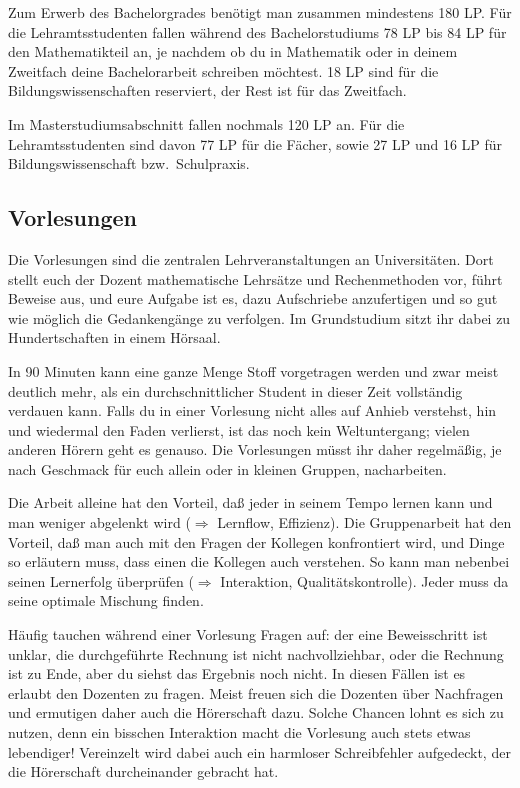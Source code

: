 Zum Erwerb des Bachelorgrades benötigt man zusammen mindestens 180 LP.
Für die Lehramtsstudenten fallen während des Bachelorstudiums
78 LP bis 84 LP für den Mathematikteil an,
je nachdem ob du in Mathematik oder in deinem Zweitfach
deine Bachelorarbeit schreiben möchtest.
18 LP sind für die Bildungswissenschaften reserviert,
der Rest ist für das Zweitfach.

Im Masterstudiumsabschnitt fallen nochmals 120 LP an.
Für die Lehramtsstudenten sind davon 77 LP für die Fächer,
sowie 27 LP und 16 LP für Bildungswissenschaft bzw.\ Schulpraxis.

\subsection{Vorlesungen}

Die Vorlesungen sind die zentralen Lehrveranstaltungen an Universitäten.
Dort stellt euch der Dozent mathematische Lehrsätze und
Rechenmethoden vor, führt Beweise aus, und eure Aufgabe ist es,
dazu Aufschriebe anzufertigen und so gut wie möglich
die Gedankengänge zu verfolgen.
Im Grundstudium sitzt ihr dabei zu Hundertschaften in einem Hörsaal.

In 90 Minuten kann eine ganze Menge Stoff vorgetragen werden
und zwar meist deutlich mehr, als ein durchschnittlicher Student
in dieser Zeit vollständig verdauen kann.
Falls du in einer Vorlesung nicht alles auf Anhieb verstehst,
hin und wiedermal den Faden verlierst,
ist das noch kein Weltuntergang;
vielen anderen Hörern geht es genauso.
Die Vorlesungen müsst ihr daher regelmäßig,
je nach Geschmack für euch allein
oder in kleinen Gruppen, nacharbeiten.

Die Arbeit alleine hat den Vorteil,
daß jeder in seinem Tempo lernen kann
und man weniger abgelenkt wird
($\Rightarrow$ \glqq Lernflow, Effizienz\grqq).
Die Gruppenarbeit hat den Vorteil,
daß man auch mit den Fragen der Kollegen konfrontiert wird,
und Dinge so erläutern muss, dass einen die Kollegen auch verstehen.
So kann man nebenbei seinen Lernerfolg überprüfen
($\Rightarrow$ \glqq Interaktion, Qualitätskontrolle\grqq).
Jeder muss da seine optimale Mischung finden.

Häufig tauchen während einer Vorlesung Fragen auf:
der eine Beweisschritt ist unklar,
die durchgeführte Rechnung ist nicht nachvollziehbar,
oder die Rechnung ist zu Ende, aber du siehst das Ergebnis noch nicht.
In diesen Fällen ist es erlaubt den Dozenten zu fragen.
Meist freuen sich die Dozenten über Nachfragen
und ermutigen daher auch die Hörerschaft dazu.
Solche Chancen lohnt es sich zu nutzen,
denn ein bisschen Interaktion macht die Vorlesung
auch stets etwas lebendiger!
Vereinzelt wird dabei auch ein harmloser Schreibfehler aufgedeckt,
der die Hörerschaft durcheinander gebracht hat.


